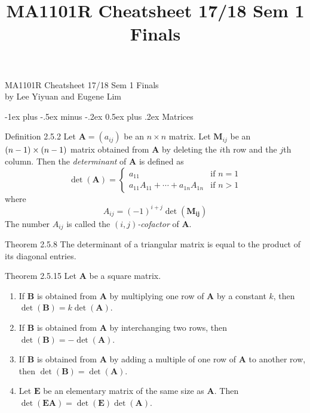 \documentclass[10pt,landscape]{article}
\title{MA1101R Cheatsheet 17/18 Sem 1 Finals}
\makeatletter
\renewcommand{\section}{\@startsection{section}{1}{0mm}%
                                {-1ex plus -.5ex minus -.2ex}%
                                {0.5ex plus .2ex}%
                                {\normalfont\large\bfseries}}
\newcommand{\matr}[1]{\bm{#1}}
\theoremstyle{definition}
\newcommand{\thistheoremname}{}
\newtheorem*{genericthm*}{\thistheoremname}
\newenvironment{namedthm*}[1]
{\renewcommand{\thistheoremname}{#1}\begin{genericthm*}}
{\end{genericthm*}}
\makeatother
\begin{document}
\begin{center}
{\large MA1101R Cheatsheet 17/18 Sem 1 Finals}\\{by Lee Yiyuan and Eugene Lim}
\end{center}

\raggedright
\footnotesize

\begin{multicols}{3}

\setlength{\premulticols}{1pt}
\setlength{\postmulticols}{1pt}
\setlength{\multicolsep}{1pt}
\setlength{\columnsep}{2pt}

\section{Matrices}

\begin{namedthm*}{Definition 2.5.2}
    Let \(\matr{A} = \left(a_{ij}\right)\) be an \(n \times n\) matrix. Let \(\matr{M}_{ij}\) be an \(\nobreak{(n - 1)\times (n - 1)}\) matrix obtained from \(\matr{A}\) by deleting the \(i\)th row and the \(j\)th column. Then the \textit{determinant} of \(\matr{A}\) is defined as
    \[
        \det(\matr{A}) = \begin{cases}
                    a_{11} & \text{if \(n = 1\)} \\
                    a_{11}A_{11} + \cdots + a_{1n}A_{1n} & \text{if \(n > 1\)}
                  \end{cases}
    \]
    where
    \[
        A_{ij} = (-1)^{i + j} \det\left(\matr{M_{ij}}\right)
    \]
    The number \(A_{ij}\) is called the \((i, j)\)\textit{-cofactor} of \(\matr{A}\).
\end{namedthm*}

\begin{namedthm*}{Theorem 2.5.8}
    The determinant of a triangular matrix is equal to the product of its diagonal entries.
\end{namedthm*}

\begin{namedthm*}{Theorem 2.5.15}
    Let \(\matr{A}\) be a square matrix.
    \begin{enumerate}
        \item If \(\matr{B}\) is obtained from \(\matr{A}\) by multiplying one row of \(\matr{A}\) by a constant \(k\), then \(\det(\matr{B}) = k\det(\matr{A})\).
        \item If \(\matr{B}\) is obtained from \(\matr{A}\) by interchanging two rows, then \(\det(\matr{B}) = -\det(\matr{A})\).
        \item If \(\matr{B}\) is obtained from \(\matr{A}\) by adding a multiple of one row of \(\matr{A}\) to another row, then \(\det(\matr{B}) = \det(\matr{A})\).
        \item Let \(\matr{E}\) be an elementary matrix of the same size as \(\matr{A}\). Then \(\det(\matr{EA}) = \det(\matr{E})\det(\matr{A})\).
    \end{enumerate}
\end{namedthm*}


\end{multicols}
\end{document}
